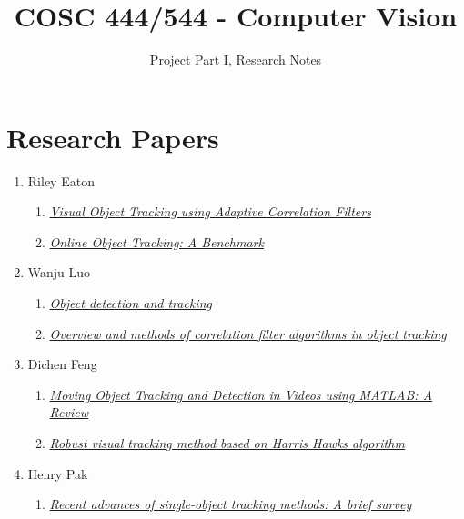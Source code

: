 \documentclass{article}
\title{COSC 444/544 - Computer Vision}
\author{Project Part I, Research Notes}
\begin{document}
\maketitle

\section*{Research Papers}

\begin{enumerate}
  \item Riley Eaton
    \begin{enumerate}[label*=\arabic*.]
      \item \textit{\href{https://typeset.io/papers/visual-object-tracking-using-adaptive-correlation-filters-1xuhtpe358}{Visual Object Tracking using Adaptive Correlation Filters}}
      \item \textit{\href{https://faculty.ucmerced.edu/mhyang/papers/cvpr13_benchmark.pdf}{Online Object Tracking: A Benchmark}}
    \end{enumerate}
  \item Wanju Luo
    \begin{enumerate}[label*=\arabic*.]
      \item \textit{\href{https://www.sciencedirect.com/science/article/pii/B9780323857871000166?via\%3Dihub}{Object detection and tracking}}
      \item \textit{\href{https://link.springer.com/article/10.1007/s40747-020-00161-4}{Overview and methods of correlation filter algorithms in object tracking}}
    \end{enumerate}
  \item Dichen Feng
    \begin{enumerate}[label*=\arabic*.]
      \item \textit{\href{https://jst.org.in/index.php/pub/article/view/743/669}{Moving Object Tracking and Detection in Videos using MATLAB: A Review}}
      \item \textit{\href{https://www.semanticscholar.org/paper/Robust-visual-tracking-method-based-on-Harris-Hawks-Charef-Khodja-Abida/e945f79be12f7d64df3d5ef69256e2a0eaec1f03}{Robust visual tracking method based on Harris Hawks algorithm}}
    \end{enumerate}
  \item Henry Pak
    \begin{enumerate}[label*=\arabic*.]
      \item \textit{\href{https://www.sciencedirect.com/science/article/pii/S0925231221007220}{Recent advances of single-object tracking methods: A brief survey}}

\end{enumerate}
\end{enumerate}
\end{document}
